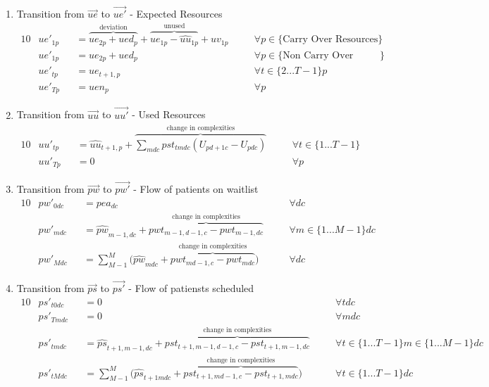 \documentclass{article}
\begin{document}
\begin{enumerate}
	\item Transition from $\vec{ue}$ to $\vec{ue'}$ - Expected Resources
	\begin{alignat}{10}
		& ue'_{1p} 
			&& 	= \overbrace{ ue_{2p} + ued_{p} }^\text{deviation}
				+ \overbrace{ ue_{1p} - \hat{uu}_{1p} }^\text{unused} + uv_{1p} \quad
			&& \forall p \in \{ \text{Carry Over Resources} \} \\
		& ue'_{1p} 
			&& 	= ue_{2p} + ued_{p} \quad
			&& \forall p \in \{ \text{Non Carry Over Resources} \} \\
		& ue'_{tp} 
			&& = ue_{t+1,p} \quad 
			&& \forall t \in \{2...T-1\} p \\
		& ue'_{Tp} 
			&& = uen_{p} \quad
			&& \forall p
	\end{alignat} 
	
	\item Transition from $\vec{uu}$ to $\vec{uu'}$ - Used Resources	
	\begin{alignat}{10}
		& uu'_{tp}
			&& = \hat{uu}_{t+1,p} + 
				\overbrace{ \sum_{mdc} pst_{tmdc} (U_{pd+1c} - U_{pdc}) }^\text{
					change in complexities} \quad
			&& \forall t \in \{1...T-1\} \\
		& uu'_{Tp}
			&& = 0 \quad
			&& \forall p
	\end{alignat}	
	
	\item Transition from $\vec{pw}$ to $\vec{pw'}$ - Flow of patients on waitlist
		\begin{alignat}{10}
			& pw'_{0dc} 
				&& = pea_{dc} \quad
				&& \forall dc \\  
			& pw'_{mdc} 
				&& = \hat{pw}_{m-1,dc} + 
				\overbrace{pwt_{m-1,d-1,c} - pwt_{m-1,dc}}^\text{
					change in complexities} \quad
				&& \forall m \in \{ 1...M-1 \} dc \\  
			& pw'_{Mdc} 
				&& = \sum_{M-1}^{M} \big( 
					\hat{pw}_{mdc} + 
					\overbrace{pwt_{md-1,c} - pwt_{mdc}}^\text{
						change in complexities} \big) \quad
				&& \forall dc
		\end{alignat}


	\item Transition from $\vec{ps}$ to $\vec{ps'}$ - Flow of patiensts scheduled
		\begin{alignat}{10}
			& ps'_{t0dc} 
				&& = 0 \quad
				&& \forall tdc \\  
			& ps'_{Tmdc} 
				&& = 0 \quad
				&& \forall mdc \\  
			& ps'_{tmdc} 
				&& = \hat{ps}_{t+1,m-1,dc} + 
				\overbrace{pst_{t+1,m-1,d-1,c} - pst_{t+1,m-1,dc}}^\text{
					change in complexities} \quad
				&& \forall t \in \{1...T-1\} m \in \{ 1...M-1 \} dc \\  
			& ps'_{tMdc} 
				&& = \sum_{M-1}^{M} \big( 
				\hat{ps}_{t+1mdc} + 
				\overbrace{pst_{t+1,md-1,c} - pst_{t+1,mdc}}^\text{
					change in complexities} \big) \quad
				&& \forall t \in \{1...T-1\} dc
		\end{alignat}
\end{enumerate}
    
\end{document}
